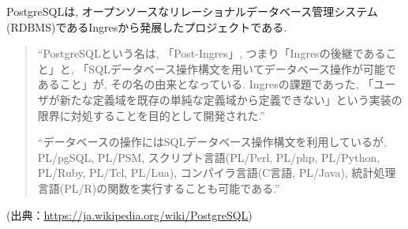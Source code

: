 PostgreSQLは, オープンソースなリレーショナルデータベース管理システム(RDBMS)であるIngresから発展したプロジェクトである.

\begin{quotation}
\begin{screen}
“PostgreSQLという名は, 「Post-Ingres」, つまり「Ingresの後継であること」と, 「SQLデータベース操作構文を用いてデータベース操作が可能であること」が, その名の由来となっている.
Ingresの課題であった, 「ユーザが新たな定義域を既存の単純な定義域から定義できない」という実装の限界に対処することを目的として開発された.”

“データベースの操作にはSQLデータベース操作構文を利用しているが, PL/pgSQL, PL/PSM, スクリプト言語(PL/Perl, PL/php, PL/Python, PL/Ruby, PL/Tcl, PL/Lua), コンパイラ言語(C言語, PL/Java), 統計処理言語(PL/R)の関数を実行することも可能である.”
\end{screen}
\end{quotation}
\begin{flushright}
(出典：\url{https://ja.wikipedia.org/wiki/PostgreSQL})
\end{flushright}

